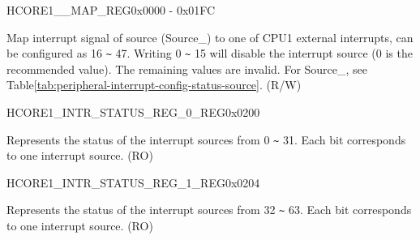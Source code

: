 \begin{register}{H}{CORE1\_\_MAP\_REG}{0x0000 - 0x01FC}\label{regdesc:CORE1SOURCEregindexYMAPREG}
%
%
\regnewline%
\begin{regdesc}\begin{reglist}
\label{fielddesc:CORE1CORE1LPWDTINTMAP}\item [CORE1\_SOURCE\_\regindex{Y}\_MAP] Map interrupt signal of source (Source\_) to one of CPU1 external interrupts, can be configured as 16 \verb+~+ 47. Writing 0 \verb+~+ 15 will disable the interrupt source (0 is the recommended value). The remaining values are invalid. For Source\_, see Table\ref{tab:peripheral-interrupt-config-status-source}.  (R/W)
\end{reglist}\end{regdesc}
\end{register}



\begin{register}{H}{CORE1\_INTR\_STATUS\_REG\_0\_REG}{0x0200}\label{regdesc:CORE1INTRSTATUSREG0REG}
%
\regnewline%
\begin{regdesc}\begin{reglist}
\label{fielddesc:CORE1CORE1INTRSTATUS0}\item [CORE1\_INTR\_STATUS\_0] Represents the status of the interrupt sources from 0 \verb+~+ 31. Each bit corresponds to one interrupt source.  (RO)
\end{reglist}\end{regdesc}
\end{register}


\begin{register}{H}{CORE1\_INTR\_STATUS\_REG\_1\_REG}{0x0204}\label{regdesc:CORE1INTRSTATUSREG1REG}
%
\regnewline%
\begin{regdesc}\begin{reglist}
\label{fielddesc:CORE1CORE1INTRSTATUS1}\item [CORE1\_INTR\_STATUS\_1] Represents the status of the interrupt sources from 32 \verb+~+ 63. Each bit corresponds to one interrupt source. (RO)
\end{reglist}\end{regdesc}
\end{register}


